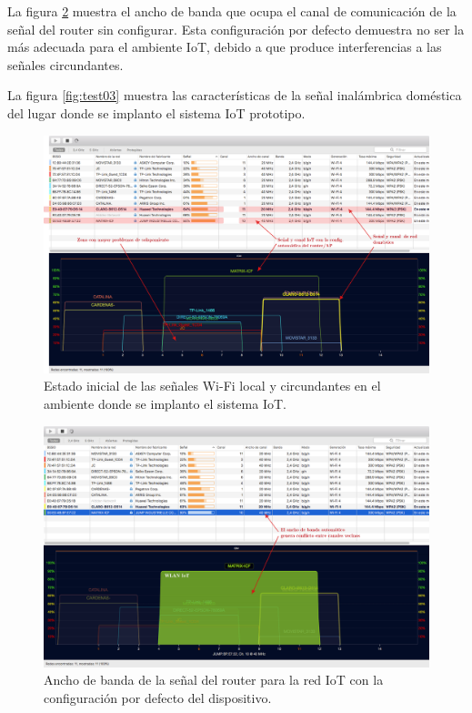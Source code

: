 La figura \ref{fig:test02} muestra el ancho de banda que ocupa el canal de comunicación de la señal del router sin configurar. Esta configuración por defecto demuestra no ser la más adecuada para el ambiente IoT, debido a que produce interferencias a las señales circundantes.

La figura \ref{fig:test03} muestra las características de la señal inalámbrica doméstica del lugar donde se implanto el sistema IoT prototipo.


\begin{landscape} %
\begin{figure}[htpb]
\centering 
\includegraphics[width=1.5\textwidth]{./Figures/wifi/01.png}
\caption{Estado inicial de las señales Wi-Fi local y circundantes en el ambiente donde se implanto el sistema IoT.}
\label{fig:test01}
\end{figure}
\end{landscape} %


\begin{landscape} %
\begin{figure}[htpb]
\centering 
\includegraphics[width=1.5\textwidth]{./Figures/wifi/02.png}
\caption{Ancho de banda de la señal del router para la red IoT con la configuración por defecto del dispositivo.}
\label{fig:test02}
\end{figure}
\end{landscape} %


